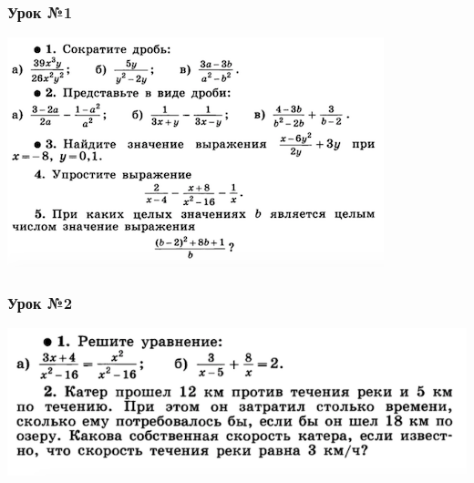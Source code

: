 \documentclass[algebra,a5paper]{pum}
\date{23.04.20}
\begin{document}
\subsubsection*{Урок №1}
\includegraphics[width=\textwidth]{img/15-1.png}

\subsubsection*{Урок №2}
\includegraphics[width=\textwidth]{img/15-2.png}
\end{document}
